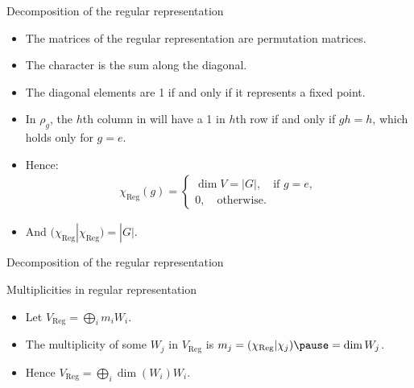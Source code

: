 \documentclass[10pt]{beamer}
\newcommand{\Reg}{\text{Reg}}
\begin{document}
	\begin{frame}{Decomposition of the regular representation}
		\begin{itemize}\pause
			\item The matrices of the regular representation are permutation matrices.
			
			\item The character is the sum along the diagonal.
			
			\item The diagonal elements are 1 if and only if it represents a fixed point.\pause
			
			\item In $\rho_g$, the $h$th column in will have a 1 in $h$th row if and only if $gh=h$, which holds only for $g = e$.\pause
			
			\item Hence: 
			\begin{align*}
				\chi_\Reg(g) = \begin{cases}
					\dim V = |G|, \quad \text{if $g=e$},\\
					0, \quad \text{otherwise}.
				\end{cases}
			\end{align*}\pause
			
			\item And $(\chi_\Reg|\chi_\Reg) = |G|$.
			
		\end{itemize}
	\end{frame}
	\begin{frame}{Decomposition of the regular representation}
		\begin{block}{Multiplicities in regular representation}
			\begin{itemize}
				\item Let $ V_\Reg = \bigoplus_i m_i W_i$.\pause
				
				\item The multiplicity of some $W_j$ in $V_\Reg$ is $m_j = (\chi_\Reg|\chi_j) \pause = \dim W_j$.\pause
				
				\item Hence $V_\Reg = \bigoplus_i \dim(W_i)W_i$.
			\end{itemize}
		\end{block}
	\end{frame}
	
\end{document}
